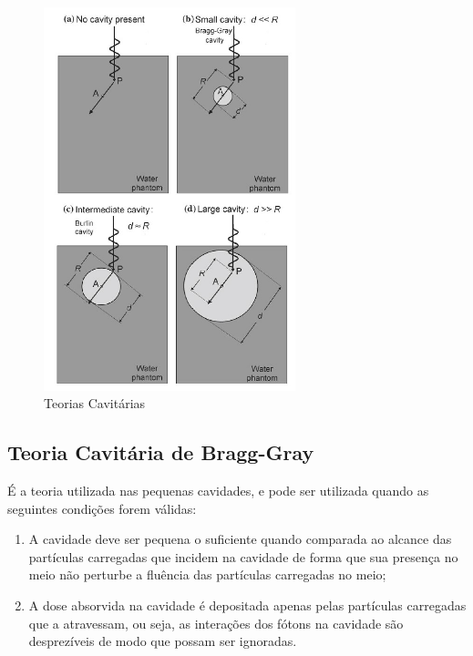 \documentclass[11pt,a4paper]{article}
\begin{document}
		\begin{figure}[h]
			\centering
			\includegraphics[width=0.65\textwidth]{Imagens/teoriasDasCavidades.jpg}
			\caption{Teorias Cavitárias}
			\label{fig:teoriasDasCavidades}
		\end{figure}

		
		\subsection{Teoria Cavitária de Bragg-Gray}

			É a teoria utilizada nas pequenas cavidades, e pode ser utilizada quando as seguintes condições forem válidas:

			\begin{enumerate}
				\item A cavidade deve ser pequena o suficiente quando comparada ao alcance das partículas carregadas que incidem na cavidade de forma que sua presença no meio não perturbe a fluência das partículas carregadas no meio;\label{cond:cav1}
				\item A dose absorvida na cavidade é depositada apenas pelas partículas carregadas que a atravessam, ou seja, as interações dos fótons na cavidade são desprezíveis de modo que possam ser ignoradas.\label{cond:cav2}
			\end{enumerate}
\end{document}
